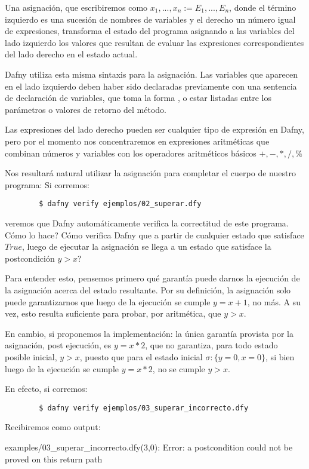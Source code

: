 \documentclass[12pt, a4paper, openany, fleqn]{book}
\begin{document}
    Una asignación, que escribiremos como $x_1,...,x_n := E_1,...,E_n$, donde el término izquierdo es una sucesión de nombres de variables y el derecho un número igual de expresiones, transforma el estado del programa asignando a las variables del lado izquierdo los valores que resultan de evaluar las expresiones correspondientes del lado derecho en el estado actual.

    Dafny utiliza esta misma sintaxis para la asignación. Las variables que aparecen en el lado izquierdo deben haber sido declaradas previamente con una sentencia de declaración de variables, que toma la forma , o estar listadas entre los parámetros o valores de retorno del método.

    Las expresiones del lado derecho pueden ser cualquier tipo de expresión en Dafny, pero por el momento nos concentraremos en expresiones aritméticas que combinan números y variables con los operadores aritméticos básicos $+,-,*,/,\%$

    Nos resultará natural utilizar la asignación para completar el cuerpo de nuestro programa:
    Si corremos:
    \begin{verbatim}
        $ dafny verify ejemplos/02_superar.dfy
    \end{verbatim}
    veremos que Dafny automáticamente verifica la correctitud de este programa. Cómo lo hace? Cómo verifica Dafny que a partir de cualquier estado que satisface $True$, luego de ejecutar la asignación  se llega a un estado que satisface la postcondición $y > x$?

    Para entender esto, pensemos primero qué garantía puede darnos la ejecución de la asignación acerca del estado resultante. Por su definición, la asignación solo puede garantizarnos que luego de la ejecución se cumple $y = x + 1$, no más. A su vez, esto resulta suficiente para probar, por aritmética, que $y > x$.

    En cambio, si proponemos la implementación:
    la única garantía provista por la asignación, post ejecución, es $y = x * 2$, que no garantiza, para todo estado posible inicial, $y > x$, puesto que para el estado inicial $\sigma:\{y=0,x=0\}$, si bien luego de la ejecución se cumple $y = x * 2 $, no se cumple $y > x$.

    En efecto, si corremos:
    \begin{verbatim}
        $ dafny verify ejemplos/03_superar_incorrecto.dfy
    \end{verbatim}
    Recibiremos como output:
    \begin{spverbatim}
    examples/03_superar_incorrecto.dfy(3,0): Error: a postcondition could not be proved on this return path
    \end{spverbatim}
\end{document}
